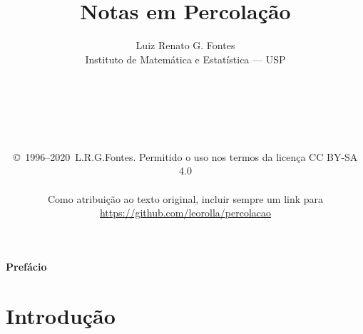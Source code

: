 \documentclass[12pt]{book}
\begin{document}


\title{\LARGE{\bf Notas em Percolação}} 
\author{Luiz Renato G. Fontes\\Instituto de Matemática e Estatística --- USP\\
\\
\\
\\
\\
\\
\\
\small
\copyright\ 1996--2020\ L.R.G.Fontes. Permitido o uso nos termos da licença CC BY-SA 4.0\\
\\
\small
Como atribuição ao texto original, incluir sempre um link para\\
\small
\url{https://github.com/leorolla/percolacao}}
\date{}
\maketitle

\newpage
{}



\mbox{}
\vspace{2cm}

\begin{flushleft}
{\Huge {\bf Prefácio}}
\end{flushleft}
\vspace{70pt}



\newpage  

\tableofcontents

\newtheorem{teo}{Teorema}[section]
\newtheorem{Teo}{Teorema}[chapter]
\newtheorem{defin}{Definição}[section]
\newtheorem{prop}{Proposição}[section]
\newtheorem{lem}{Lema}[section]
\newtheorem{obs}{Observação}[section]
\newtheorem{cor}{Corolário}[section]
\newtheorem{Defin}{Definição}[chapter]
\newtheorem{Prop}{Proposição}[chapter]
\newtheorem{Lem}{Lema}[chapter]
\newtheorem{Obs}{Observação}[chapter]
\newtheorem{Cor}{Corolário}[chapter]
\renewcommand{\theequation}{\thesection .\arabic{equation}}




\chapter{Introdução}
\setcounter{equation}{0}
\label{chp:int}

\end{document}

